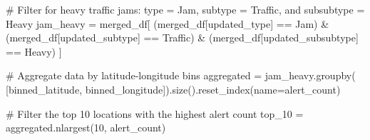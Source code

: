\documentclass[
  letterpaper,
  DIV=11,
  numbers=noendperiod]{scrartcl}
\newenvironment{Shaded}{\begin{snugshade}}{\end{snugshade}}
\newcommand{\CommentTok}[1]{\textcolor[rgb]{0.37,0.37,0.37}{#1}}
\newcommand{\DecValTok}[1]{\textcolor[rgb]{0.68,0.00,0.00}{#1}}
\newcommand{\NormalTok}[1]{\textcolor[rgb]{0.00,0.23,0.31}{#1}}
\newcommand{\OperatorTok}[1]{\textcolor[rgb]{0.37,0.37,0.37}{#1}}
\newcommand{\StringTok}[1]{\textcolor[rgb]{0.13,0.47,0.30}{#1}}
\begin{document}
\begin{Shaded}
\begin{Highlighting}[]
\CommentTok{\# Filter for heavy traffic jams: type = \textquotesingle{}Jam\textquotesingle{}, subtype = \textquotesingle{}Traffic\textquotesingle{}, and subsubtype = \textquotesingle{}Heavy\textquotesingle{}}
\NormalTok{jam\_heavy }\OperatorTok{=}\NormalTok{ merged\_df[}
\NormalTok{    (merged\_df[}\StringTok{\textquotesingle{}updated\_type\textquotesingle{}}\NormalTok{] }\OperatorTok{==} \StringTok{\textquotesingle{}Jam\textquotesingle{}}\NormalTok{) }\OperatorTok{\&}
\NormalTok{    (merged\_df[}\StringTok{\textquotesingle{}updated\_subtype\textquotesingle{}}\NormalTok{] }\OperatorTok{==} \StringTok{\textquotesingle{}Traffic\textquotesingle{}}\NormalTok{) }\OperatorTok{\&}
\NormalTok{    (merged\_df[}\StringTok{\textquotesingle{}updated\_subsubtype\textquotesingle{}}\NormalTok{] }\OperatorTok{==} \StringTok{\textquotesingle{}Heavy\textquotesingle{}}\NormalTok{)}
\NormalTok{]}

\CommentTok{\# Aggregate data by latitude{-}longitude bins}
\NormalTok{aggregated }\OperatorTok{=}\NormalTok{ jam\_heavy.groupby(}
\NormalTok{    [}\StringTok{\textquotesingle{}binned\_latitude\textquotesingle{}}\NormalTok{, }\StringTok{\textquotesingle{}binned\_longitude\textquotesingle{}}\NormalTok{]).size().reset\_index(name}\OperatorTok{=}\StringTok{\textquotesingle{}alert\_count\textquotesingle{}}\NormalTok{)}

\CommentTok{\# Filter the top 10 locations with the highest alert count}
\NormalTok{top\_10 }\OperatorTok{=}\NormalTok{ aggregated.nlargest(}\DecValTok{10}\NormalTok{, }\StringTok{\textquotesingle{}alert\_count\textquotesingle{}}\NormalTok{)}
\end{Highlighting}
\end{Shaded}
\end{document}
